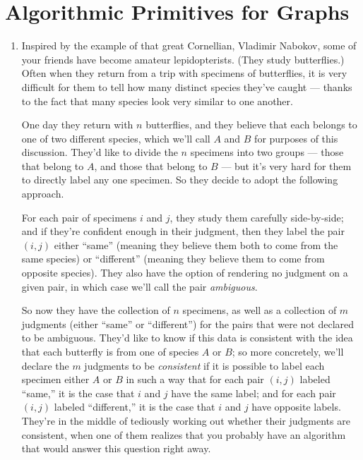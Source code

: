 \documentclass[12pt]{article}
\begin{document}
\section{Algorithmic Primitives for Graphs}


\begin{enumerate}


\item 

Inspired by the example of that great Cornellian, Vladimir Nabokov,
some of your friends have become amateur lepidopterists.
(They study butterflies.)
Often when they return from a trip with specimens of butterflies,
it is very difficult for them to tell how many distinct species
they've caught --- thanks to the fact that many species look very similar
to one another.

One day they return with $n$ butterflies, and they believe
that each belongs to one of two different species,
which we'll call $A$ and $B$ for purposes of this discussion.
They'd like to divide the $n$ specimens into two groups ---
those that belong to $A$, and those that belong to $B$ ---
but it's very hard for them to directly label any one specimen.
So they decide to adopt the following approach.

For each pair of specimens $i$ and $j$, they study them
carefully side-by-side; and if they're confident enough
in their judgment, then they label the pair $(i,j)$
either ``same'' (meaning they believe them both to come from the
same species) or ``different'' (meaning they believe them to
come from opposite species).
They also have the option of rendering no judgment on a given
pair, in which case we'll call the pair {\em ambiguous}.

So now they have the collection of $n$ specimens, as well
as a collection of $m$ judgments (either ``same'' or ``different'')
for the pairs that were not declared to be ambiguous.
They'd like to know if this data is consistent with the
idea that each butterfly is from one of species $A$ or $B$;
so more concretely, we'll declare the $m$ judgments to be
{\em consistent} if it is possible to label each specimen either $A$ or $B$
in such a way that for each pair $(i,j)$ labeled ``same,''
it is the case that $i$ and $j$ have the same label;
and for each pair $(i,j)$ labeled ``different,''
it is the case that $i$ and $j$ have opposite labels.
They're in the middle of tediously working out whether
their judgments are consistent, when one of them realizes
that you probably have an algorithm that would answer
this question right away.


\end{enumerate}
\end{document}
